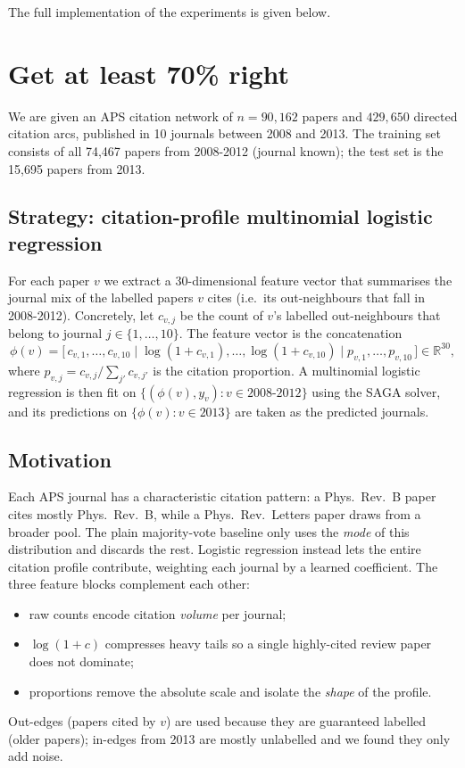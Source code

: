 \documentclass[12pt]{article}
\theoremstyle{definition}
\begin{document}
The full implementation of the experiments is given below.



\newpage
\section{Get at least 70\% right}

We are given an APS citation network of $n = 90{,}162$ papers and $429{,}650$ directed citation arcs, published in 10 journals between 2008 and 2013. The training set consists of all 74{,}467 papers from 2008-2012 (journal known); the test set is the 15{,}695 papers from 2013.

\subsection*{Strategy: citation-profile multinomial logistic regression}

For each paper $v$ we extract a 30-dimensional feature vector that summarises the journal mix of the labelled papers $v$ cites (i.e.\ its out-neighbours that fall in 2008-2012). Concretely, let $c_{v,j}$ be the count of $v$'s labelled out-neighbours that belong to journal $j \in \{1, \ldots, 10\}$. The feature vector is the concatenation
\[
  \phi(v) = \big[\, c_{v,1}, \ldots, c_{v,10} \;\big|\; \log(1 + c_{v,1}), \ldots, \log(1 + c_{v,10}) \;\big|\; p_{v,1}, \ldots, p_{v,10} \,\big] \in \mathbb{R}^{30},
\]
where $p_{v,j} = c_{v,j} / \sum_{j'} c_{v,j'}$ is the citation proportion. A multinomial logistic regression is then fit on $\{(\phi(v), y_v) : v \in \text{2008-2012}\}$ using the SAGA solver, and its predictions on $\{\phi(v) : v \in 2013\}$ are taken as the predicted journals.

\subsection*{Motivation}

Each APS journal has a characteristic citation pattern: a Phys.\ Rev.\ B paper cites mostly Phys.\ Rev.\ B, while a Phys.\ Rev.\ Letters paper draws from a broader pool. The plain majority-vote baseline only uses the \emph{mode} of this distribution and discards the rest. Logistic regression instead lets the entire citation profile contribute, weighting each journal by a learned coefficient. The three feature blocks complement each other:
\begin{itemize}
  \item raw counts encode citation \emph{volume} per journal;
  \item $\log(1 + c)$ compresses heavy tails so a single highly-cited review paper does not dominate;
  \item proportions remove the absolute scale and isolate the \emph{shape} of the profile.
\end{itemize}
Out-edges (papers cited by $v$) are used because they are guaranteed labelled (older papers); in-edges from 2013 are mostly unlabelled and we found they only add noise.
\end{document}
